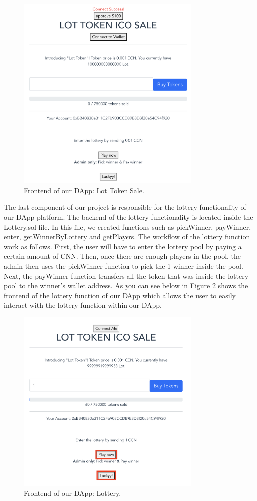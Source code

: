 \documentclass[11pt]{article}
\newcommand {\rfig}[1]{Figure \ref{fig:#1}}
\begin{document}
\begin{figure}[!t]
\centering
\includegraphics[width=3.5in]{figure1.png}
\caption{Frontend of our DApp: Lot Token Sale.}
\label{fig:fig1}
\end{figure}

The last component of our project is responsible for the lottery functionality of our DApp platform. The backend of the lottery functionality is located inside the Lottery.sol file. In this file, we created functions such as pickWinner, payWinner, enter, getWinnerByLottery and getPlayers. The workflow of the lottery function work as follows. First, the user will have to enter the lottery pool by paying a certain amount of CNN. Then, once there are enough players in the pool, the admin then uses the pickWinner function to pick the 1 winner inside the pool. Next, the payWinner function transfers all the token that was inside the lottery pool to the winner’s wallet address. As you can see below in \rfig{fig2} shows the frontend of the lottery function of our DApp which allows the user to easily interact with the lottery function within our DApp. \\

\begin{figure}[!t]
\centering
\includegraphics[width=3.5in]{figure2.png}
\caption{Frontend of our DApp: Lottery.}
\label{fig:fig2}
\end{figure}
\end{document}
